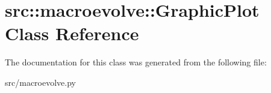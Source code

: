 \hypertarget{classsrc_1_1macroevolve_1_1GraphicPlot}{
\section{src::macroevolve::GraphicPlot Class Reference}
\label{classsrc_1_1macroevolve_1_1GraphicPlot}
}


The documentation for this class was generated from the following file:\begin{DoxyCompactItemize}
\item 
src/macroevolve.py\end{DoxyCompactItemize}
